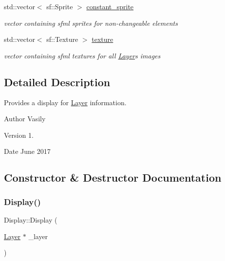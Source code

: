 \begin{DoxyCompactItemize}
\mbox{\label{class_display_a1a3dd88f53281f8bc2294f33862dced0}} 
std\+::vector$<$ sf\+::\+Sprite $>$ \hyperlink{class_display_a1a3dd88f53281f8bc2294f33862dced0}{constant\+\_\+sprite}
\begin{DoxyCompactList}\small\item\em vector containing sfml sprites for non-\/changeable elements \end{DoxyCompactList}\item 
\mbox{\label{class_display_acc1a00673738d4dc7451caf213982e4d}} 
std\+::vector$<$ sf\+::\+Texture $>$ \hyperlink{class_display_acc1a00673738d4dc7451caf213982e4d}{texture}
\begin{DoxyCompactList}\small\item\em vector containing sfml textures for all \hyperlink{class_layer}{Layer}\textquotesingle{}s images \end{DoxyCompactList}\end{DoxyCompactItemize}


\subsection{Detailed Description}
Provides a display for \hyperlink{class_layer}{Layer} information. 

\begin{DoxyAuthor}{Author}
Vasily 
\end{DoxyAuthor}
\begin{DoxyVersion}{Version}
1. 
\end{DoxyVersion}
\begin{DoxyDate}{Date}
June 2017 
\end{DoxyDate}


\subsection{Constructor \& Destructor Documentation}
\mbox{\label{class_display_a26d0e334f62107584f42e8fa3608f546}} 
\subsubsection{\texorpdfstring{Display()}{Display()}}
{\footnotesize\ttfamily Display\+::\+Display (\begin{DoxyParamCaption}\item[{\hyperlink{class_layer}{Layer} $\ast$}]{\+\_\+layer }\end{DoxyParamCaption})}



